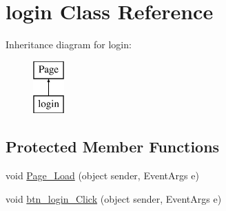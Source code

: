 \hypertarget{classlogin}{}\section{login Class Reference}
\label{classlogin}
Inheritance diagram for login\+:\begin{figure}[H]
\begin{center}
\leavevmode
\includegraphics[height=2.000000cm]{classlogin}
\end{center}
\end{figure}
\subsection*{Protected Member Functions}
\begin{DoxyCompactItemize}
\item 
void \mbox{\hyperlink{classlogin_a30ed18159e2ef11720b7447ad4a9cb28}{Page\+\_\+\+Load}} (object sender, Event\+Args e)
\item 
void \mbox{\hyperlink{classlogin_a96bab638c3ffe100ae8bbaf85ca80d5e}{btn\+\_\+login\+\_\+\+Click}} (object sender, Event\+Args e)
\end{DoxyCompactItemize}
